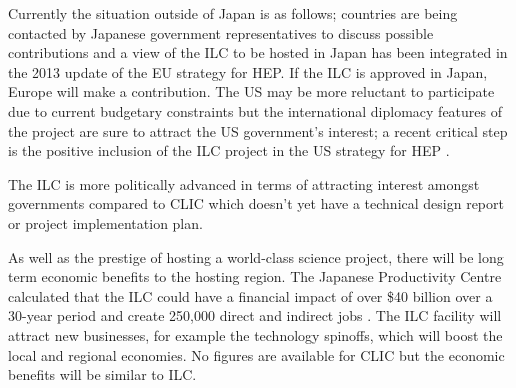 Currently the situation outside of Japan is as follows; countries are being contacted by Japanese government representatives to discuss possible contributions and a view of the ILC to be hosted in Japan has been integrated in the 2013 update of the EU strategy for HEP. If the ILC is approved in Japan, Europe will make a contribution. The US may be more reluctant to participate due to current budgetary constraints but the international diplomacy features of the project are sure to attract the US government’s interest; a recent critical step is the positive inclusion of the ILC project in the US strategy for HEP \cite{Funding:NaturePress1, LCC:Press5}.
 
The ILC is more politically advanced in terms of attracting interest amongst governments compared to CLIC which doesn’t yet have a technical design report or project implementation plan.
 
As well as the prestige of hosting a world-class science project, there will be long term economic benefits to the hosting region. The Japanese Productivity Centre calculated that the ILC could have a financial impact of over \$40 billion over a 30-year period and create 250,000 direct and indirect jobs \cite{Funding:SwissInfo}. The ILC facility will attract new businesses, for example the technology spinoffs, which will boost the local and regional economies. No figures are available for CLIC but the economic benefits will be similar to ILC.